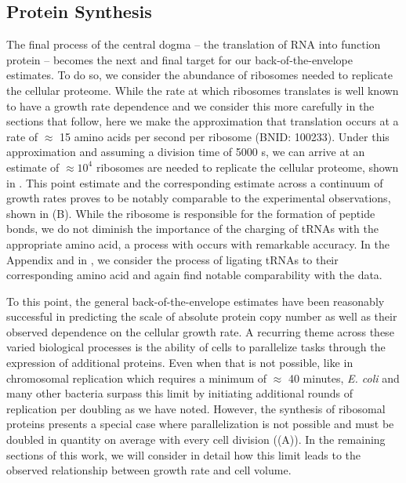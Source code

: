 \subsection{Protein Synthesis}
The final process of the central dogma -- the translation of RNA into function
protein -- becomes the next and final target for our back-of-the-envelope
estimates. To do so, we consider the abundance of ribosomes needed to replicate
the cellular proteome.  While the rate at which ribosomes
translates is well known to have a growth rate dependence \cite{dai2018} and
we consider this more carefully in the sections that follow, here we make the
approximation that translation occurs at a rate of $\approx$ 15 amino acids
per second per ribosome (BNID: 100233). Under this approximation and assuming
a division time of 5000 s, we can arrive at an estimate of $\approx 10^4$
ribosomes are needed to replicate the cellular proteome, shown in
. This point estimate and the corresponding estimate
across a continuum of growth rates proves to be notably comparable 
to the experimental observations, shown in (B).
While the ribosome is responsible for the formation of peptide bonds, we do not
diminish the importance of the charging of tRNAs with the appropriate amino
acid, a process with occurs with remarkable accuracy. In the Appendix and in , we consider
the process of ligating tRNAs to their corresponding amino acid and again find
notable comparability with the data. 

To this point, the general back-of-the-envelope estimates have been reasonably
successful in predicting the scale of absolute protein copy number as well as
their observed dependence on the cellular growth rate. A recurring theme across
these varied biological processes is the ability of cells to  parallelize tasks
through the expression of additional proteins.  Even when that is not possible,
like in chromosomal replication which  requires a minimum of $\approx$ 40
minutes, \textit{E. coli} and many other bacteria surpass this limit by
initiating additional rounds of replication per doubling as we have noted. However, the synthesis
of ribosomal proteins presents a special case where parallelization is not
possible and must be doubled in quantity on average with every cell division
((A)). In the remaining sections of this work, we will
consider in detail how this limit leads to the observed relationship between
growth rate and cell volume.



